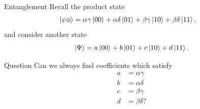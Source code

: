         \begin{frame}{Entanglement}
            Recall the product state
            \begin{equation*}
                \begin{split}
                    \ket{\psi\phi}
                    &= \alpha \gamma \ket{00}  
                    + \alpha \delta \ket{01} 
                    + \beta \gamma \ket{10}  
                    + \beta \delta \ket{11},
                \end{split}
            \end{equation*}
            and consider another state
            \begin{equation*}
                \ket{\Psi}
                = a \ket{00}  
                + b \ket{01} 
                + c \ket{10}  
                + d \ket{11}.
            \end{equation*}
            \vspace{-0.5cm}
            \begin{block}{Question}
                Can we always find coefficients which satisfy 
                \begin{equation*}
                    \begin{split}
                        a&= \alpha \gamma  \\
                        b&=  \alpha \delta  \\
                        c&= \beta \gamma   \\
                        d&=  \beta \delta ? 
                    \end{split}
                \end{equation*}
            \end{block}
        \end{frame}
